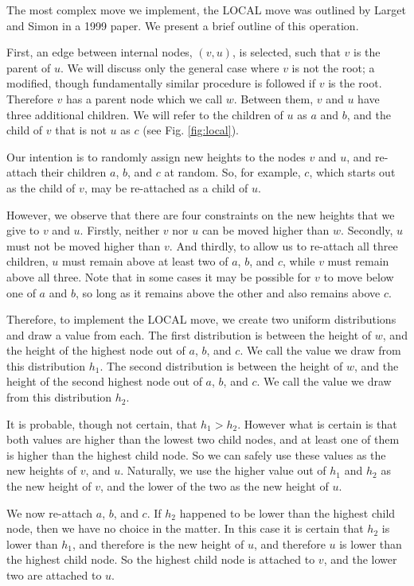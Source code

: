 \documentclass[10pt,journal,compsoc]{IEEEtran}
\begin{document}
The most complex move we implement, the LOCAL move was outlined by Larget and Simon in a 1999 paper. We present a brief outline of this operation.

First, an edge between internal nodes, $(v, u)$, is selected, such that $v$ is the parent of $u$. We will discuss only the general case where $v$ is not the root; a modified, though fundamentally similar procedure is followed if $v$ is the root. Therefore $v$ has a parent node which we call $w$. Between them, $v$ and $u$ have three additional children. We will refer to the children of $u$ as $a$ and $b$, and the child of $v$ that is not $u$ as $c$ (see Fig. \ref{fig:local}).

Our intention is to randomly assign new heights to the nodes $v$ and $u$, and re-attach their children $a$, $b$, and $c$ at random. So, for example, $c$, which starts out as the child of $v$, may be re-attached as a child of $u$.

However, we observe that there are four constraints on the new heights that we give to $v$ and $u$. Firstly, neither $v$ nor $u$ can be moved higher than $w$. Secondly, $u$ must not be moved higher than $v$. And thirdly, to allow us to re-attach all three children, $u$ must remain above at least two of $a$, $b$, and $c$, while $v$ must remain above all three. Note that in some cases it may be possible for $v$ to move below one of $a$ and $b$, so long as it remains above the other and also remains above $c$.

Therefore, to implement the LOCAL move, we create two uniform distributions and draw a value from each. The first distribution is between the height of $w$, and the height of the highest node out of $a$, $b$, and $c$. We call the value we draw from this distribution $h_1$. The second distribution is between the height of $w$, and the height of the second highest node out of $a$, $b$, and $c$. We call the value we draw from this distribution $h_2$.

It is probable, though not certain, that $h_1 > h_2$. However what is certain is that both values are higher than the lowest two child nodes, and at least one of them is higher than the highest child node. So we can safely use these values as the new heights of $v$, and $u$. Naturally, we use the higher value out of $h_1$ and $h_2$ as the new height of $v$, and the lower of the two as the new height of $u$.

We now re-attach $a$, $b$, and $c$. If $h_2$ happened to be lower than the highest child node, then we have no choice in the matter. In this case it is certain that $h_2$ is lower than $h_1$, and therefore is the new height of $u$, and therefore $u$ is lower than the highest child node. So the highest child node is attached to $v$, and the lower two are attached to $u$.
\end{document}

